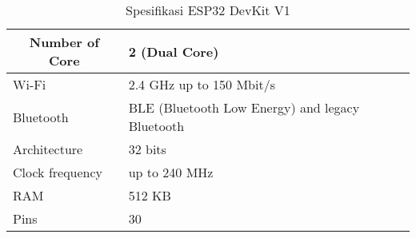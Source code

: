 \begin{table}[H]
	\caption{Spesifikasi ESP32 DevKit V1}
	\label{tab:spesifikasi}
	\centering
	\begin{tabular}{|l|l|}
		\hline
		\multicolumn{1}{|c|}{Number of Core} & 2 (Dual Core)                                                                                                                                                                                                                                                                \\ \hline
		Wi-Fi                                & 2.4 GHz up to 150 Mbit/s                                                                                                                                                                                                                                                     \\ \hline
		Bluetooth                            & BLE (Bluetooth Low Energy) and legacy Bluetooth                                                                                                                                                                                                                              \\ \hline
		Architecture                         & 32 bits                                                                                                                                                                                                                                                                      \\ \hline
		Clock frequency                      & up to 240 MHz                                                                                                                                                                                                                                                                \\ \hline
		RAM                                  & 512 KB                                                                                                                                                                                                                                                                       \\ \hline
		Pins                                 & 30                                                                                                                                                                                                                                                                           \\ \hline

\end{tabular}
\end{table}
